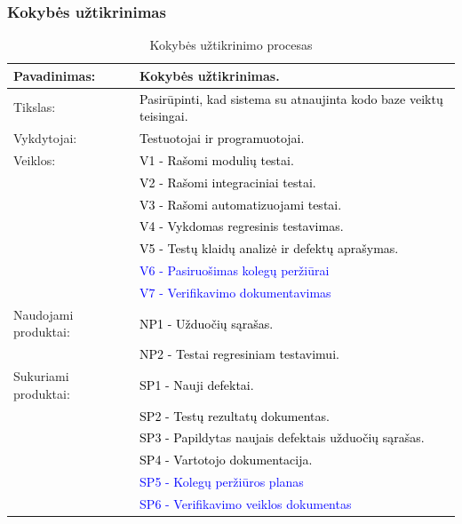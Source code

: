 \documentclass{VUMIFPSkursinis}
\begin{document}
	\subsubsection{Kokybės užtikrinimas}
	\begin{center}
		\begin{table}[ht]
			\caption{Kokybės užtikrinimo procesas}
			\begin{tabular}{ | l | l | }
				\hline
				Pavadinimas:          & Kokybės užtikrinimas.                                \\ \hline
				Tikslas:              & \textcolor{black}{Pasirūpinti, kad sistema su atnaujinta kodo baze veiktų teisingai.} \\ \hline
				Vykdytojai:	          & \textcolor{black}{Testuotojai ir programuotojai.}                       \\ \hline
				Veiklos:              & \textcolor{black}{V1 - Rašomi modulių testai.}                          \\
				                      & \textcolor{black}{V2 - Rašomi integraciniai testai.}                    \\
				                      & \textcolor{black}{V3 - Rašomi automatizuojami testai.}                  \\
				                      & \textcolor{black}{V4 - Vykdomas regresinis testavimas.}                 \\
				                      & \textcolor{black}{V5 - Testų klaidų analizė ir defektų aprašymas.}      \\ 
						      & \textcolor{blue}{V6 - Pasiruošimas kolegų peržiūrai}\\	
						      & \textcolor{blue}{V7 - Verifikavimo dokumentavimas} \\ \hline
				Naudojami produktai:  & \textcolor{black}{NP1 - Užduočių sąrašas.}                              \\
				                      & \textcolor{black}{NP2 - Testai regresiniam testavimui.}                 \\ \hline
				Sukuriami produktai:  & \textcolor{black}{SP1 - Nauji defektai.}                                \\
				                      & \textcolor{black}{SP2 - Testų rezultatų dokumentas.}                    \\
				                      & \textcolor{black}{SP3 - Papildytas naujais defektais užduočių sąrašas.} \\
				                      & \textcolor{black}{SP4 - Vartotojo dokumentacija.}                       \\ 
						      & \textcolor{blue}{SP5 - Kolegų peržiūros planas}\\ 
						      & \textcolor{blue}{SP6 - Verifikavimo veiklos dokumentas} \\ \hline
			\end{tabular}
		\end{table}
	\end{center}
\end{document}
